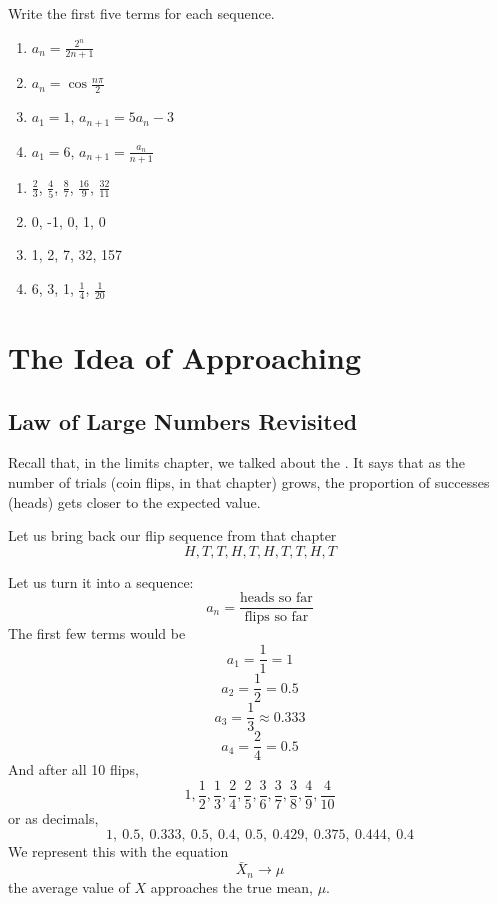 \begin{Exercise}[label = seqcalc1]
    Write the first five terms for each sequence.
    \begin{enumerate}
        \item $a_n = \frac{2^n}{2n+1}$
        \item $a_n = \cos{\frac{n\pi}{2}}$
        \item $a_1 = 1$, $a_{n+1} = 5a_n-3$
        \item $a_1 = 6$, $a_{n+1} = \frac{a_n}{n+1}$
    \end{enumerate}
\end{Exercise}

\begin{Answer}[ref=seqcalc1]
    \begin{enumerate}
        \item $\frac{2}{3}$, $\frac{4}{5}$, $\frac{8}{7}$, $\frac{16}{9}$, $\frac{32}{11}$
        \item 0, -1, 0, 1, 0
        \item 1, 2, 7, 32, 157
        \item 6, 3, 1, $\frac{1}{4}$, $\frac{1}{20}$
    \end{enumerate}
\end{Answer}



\section{The Idea of Approaching}
\subsection{Law of Large Numbers Revisited}
Recall that, in the limits chapter, we talked about the . It says that as the number of trials (coin flips, in that chapter) grows, the proportion of successes (heads) gets closer to the expected value.

Let us bring back our flip sequence from that chapter
\[
    H, T, T, H, T, H, T, T, H, T
\]

Let us turn it into a sequence: \[a_n = \frac{\text{heads so far}}{\text{flips so far}}\]
The first few terms would be
\[
    a_1 = \frac{1}{1} = 1
\]
\[
    a_2 = \frac{1}{2} = 0.5
\]
\[
    a_3 = \frac{1}{3} \approx 0.333
\]
\[
    a_4 = \frac{2}{4} = 0.5
\]
And after all 10 flips, 
\[1,\frac{1}{2},\frac{1}{3},\frac{2}{4},\frac{2}{5},\frac{3}{6},\frac{3}{7},\frac{3}{8},\frac{4}{9},\frac{4}{10}\]
or as decimals,
\[
1,\ 0.5,\ 0.333,\ 0.5,\ 0.4,\ 0.5,\ 0.429,\ 0.375,\ 0.444,\ 0.4
\]
We represent this with the equation
\[
\bar X_n \to \mu
\]
the average value of $X$ approaches the true mean, $\mu$.

